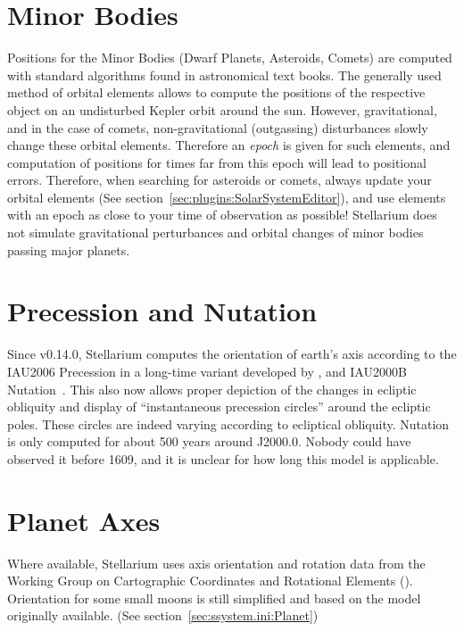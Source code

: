\section{Minor Bodies}
\label{sec:Accuracy:MinorBodies}

Positions for the Minor Bodies (Dwarf Planets, Asteroids, Comets) are
computed with standard algorithms found in astronomical text
books. The generally used method of orbital elements allows to compute
the positions of the respective object on an undisturbed Kepler orbit
around the sun. However, gravitational, and in the case of comets,
non-gravitational (outgassing) disturbances slowly change these
orbital elements. Therefore an \emph{epoch} is given for such
elements, and computation of positions for times far from this epoch
will lead to positional errors. Therefore, when searching for
asteroids or comets, always update your orbital elements (See section~\ref{sec:plugins:SolarSystemEditor}), 
and use elements with an epoch as close to your time of observation as
possible! Stellarium does not simulate gravitational perturbances and
orbital changes of minor bodies passing major planets.

\section{Precession and Nutation}
\label{sec:Accuracy:Precession}

Since v0.14.0, Stellarium computes the orientation of earth's axis
according to the IAU2006 Precession in a long-time variant developed
by \citet{2011AA:Vondrak, 2012AA:Vondrak}, and IAU2000B Nutation~\citep{Nutation:IAU2000B}.
This also now allows proper depiction of the changes in ecliptic obliquity
and display of ``instantaneous precession circles'' around the
ecliptic poles. These circles are indeed varying according to
ecliptical obliquity. Nutation is only computed for about 500 years
around J2000.0. Nobody could have observed it before 1609, and it is
unclear for how long this model is applicable.

\section{Planet Axes}
\label{sec:Accuracy:PlanetAxes}

Where available, Stellarium uses  axis orientation
and rotation data from the  Working Group on
Cartographic Coordinates and Rotational Elements ().
Orientation for some small moons is still simplified and
based on the model originally available. (See section~\ref{sec:ssystem.ini:Planet})

